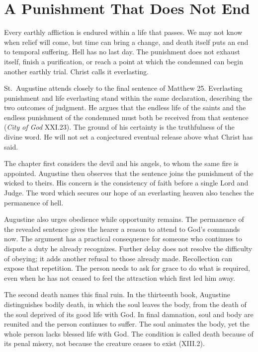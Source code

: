 \section{A Punishment That Does Not End}

Every earthly affliction is endured within a life that passes. We may not know when relief will come, but time can bring a change, and death itself puts an end to temporal suffering. Hell has no last day. The punishment does not exhaust itself, finish a purification, or reach a point at which the condemned can begin another earthly trial. Christ calls it everlasting.

St.~Augustine attends closely to the final sentence of Matthew 25. Everlasting punishment and life everlasting stand within the same declaration, describing the two outcomes of judgment. He argues that the endless life of the saints and the endless punishment of the condemned must both be received from that sentence (\emph{City of God} XXI.23). The ground of his certainty is the truthfulness of the divine word. He will not set a conjectured eventual release above what Christ has said.

The chapter first considers the devil and his angels, to whom the same fire is appointed. Augustine then observes that the sentence joins the punishment of the wicked to theirs. His concern is the consistency of faith before a single Lord and Judge. The word which secures our hope of an everlasting heaven also teaches the permanence of hell.

Augustine also urges obedience while opportunity remains. The permanence of the revealed sentence gives the hearer a reason to attend to God's commands now. The argument has a practical consequence for someone who continues to dispute a duty he already recognizes. Further delay does not resolve the difficulty of obeying; it adds another refusal to those already made. Recollection can expose that repetition. The person needs to ask for grace to do what is required, even when he has not ceased to feel the attraction which first led him away.

The second death names this final ruin. In the thirteenth book, Augustine distinguishes bodily death, in which the soul leaves the body, from the death of the soul deprived of its good life with God. In final damnation, soul and body are reunited and the person continues to suffer. The soul animates the body, yet the whole person lacks blessed life with God. The condition is called death because of its penal misery, not because the creature ceases to exist (XIII.2).

